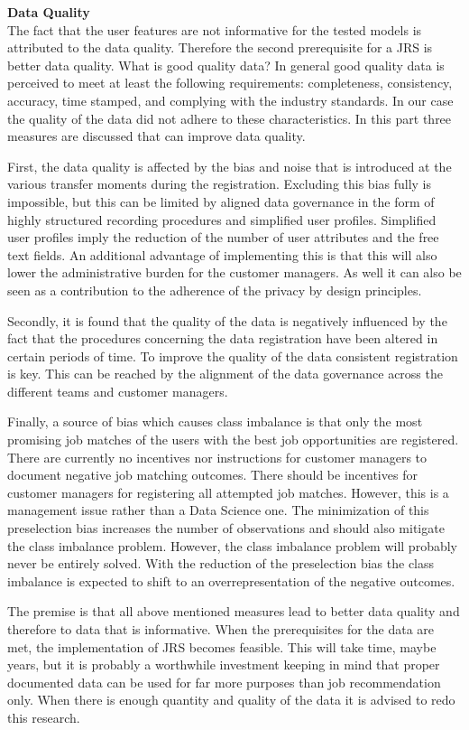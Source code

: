 \noindent
\textbf{Data Quality}\\
The fact that the user features are not informative for the tested models is attributed to the data quality. 
Therefore the second prerequisite for a JRS is better data quality.
What is good quality data?
In general good quality data is perceived to meet at least the following requirements: completeness, consistency, accuracy, time stamped, and complying with the industry standards. 
In our case the quality of the data did not adhere to these characteristics. 
In this part three measures are discussed that can improve data quality.

First, the data quality is affected by the bias and noise that is introduced at the various transfer moments during the registration.
Excluding this bias fully is impossible, but this can be limited by aligned data governance in the form of highly structured recording procedures and simplified user profiles.
Simplified user profiles imply the reduction of the number of user attributes and the free text fields. 
An additional advantage of implementing this is that this will also lower the administrative burden for the customer managers.
As well it can also be seen as a contribution to the adherence of the privacy by design principles. 

Secondly, it is found that the quality of the data is negatively influenced by the fact that the procedures concerning the data registration have been altered in certain periods of time. 
To improve the quality of the data consistent registration is key.
This can be reached by the alignment of the data governance across the different teams and customer managers.

Finally, a source of bias which causes class imbalance is that only the most promising job matches of the users with the best job opportunities are registered. 
There are currently no incentives nor instructions for customer managers to document negative job matching outcomes. 
There should be incentives for customer managers for registering all attempted job matches.
However, this is a management issue rather than a Data Science one.
The minimization of this preselection bias increases the number of observations and should also mitigate the class imbalance problem.
However, the class imbalance problem will probably never be entirely solved.
With the reduction of the preselection bias the class imbalance is expected to shift to an overrepresentation of the negative outcomes.

The premise is that all above mentioned measures lead to better data quality and therefore to data that is informative.
When the prerequisites for the data are met, the implementation of JRS becomes feasible.
This will take time, maybe years, but it is probably a worthwhile investment keeping in mind that proper documented data can be used for far more purposes than job recommendation only.
When there is enough quantity and quality of the data it is advised to redo this research. 
